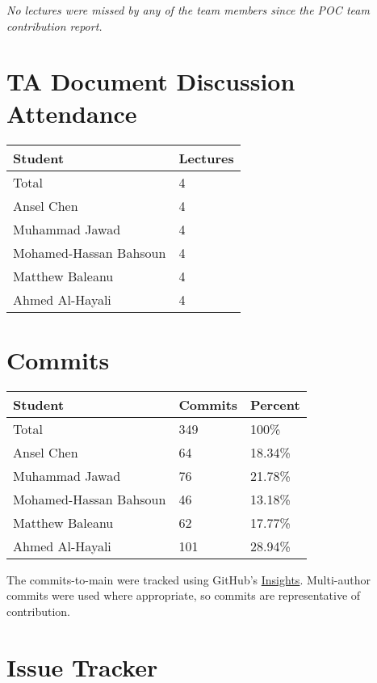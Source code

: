 \documentclass{article}
\begin{document}
\emph{No lectures were missed by any of the team members since the POC team contribution report.}

\section{TA Document Discussion Attendance}

\begin{table}[H]
\centering
\begin{tabular}{ll}
\toprule
\textbf{Student} & \textbf{Lectures}\\
\midrule
Total & 4\\
Ansel Chen & 4\\
Muhammad Jawad & 4\\
Mohamed-Hassan Bahsoun & 4\\
Matthew Baleanu & 4\\
Ahmed Al-Hayali & 4\\
\bottomrule
\end{tabular}
\end{table}

\section{Commits}

\begin{table}[H]
\centering
\begin{tabular}{lll}
\toprule
\textbf{Student} & \textbf{Commits} & \textbf{Percent}\\
\midrule
Total & 349 & 100\% \\
Ansel Chen & 64 & 18.34\% \\
Muhammad Jawad & 76 & 21.78\% \\
Mohamed-Hassan Bahsoun & 46 & 13.18\% \\
Matthew Baleanu & 62 & 17.77\% \\
Ahmed Al-Hayali & 101 & 28.94\% \\
\bottomrule
\end{tabular}
\end{table}

The commits-to-main were tracked using GitHub's \href{https://github.com/AhmedAl-Hayali/GenreGuru/graphs/contributors}{Insights}. Multi-author commits were used where appropriate, so commits are representative of contribution.

\section{Issue Tracker}
\end{document}

